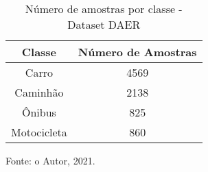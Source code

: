 \begin{table}[htp]
\centering
\caption{Número de amostras por classe - Dataset DAER}
\label{tab:daer_dataset}
{%
\begin{tabular}{cc}
\hline
\textbf{Classe} & \textbf{Número de Amostras} \\ \hline
Carro           & 4569                        \\
Caminhão        & 2138                        \\
Ônibus          & 825                         \\
Motocicleta     & 860                         \\ \hline
\end{tabular}%

Fonte: o Autor, 2021.
}
\end{table}